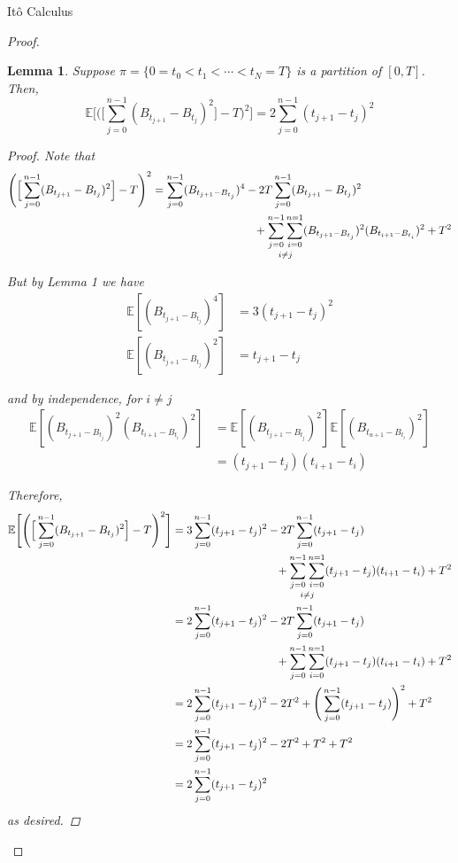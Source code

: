 \documentclass[12pt]{article}
\newtheorem{lemma}{Lemma}
\begin{document}
\begin{section}{It\^{o} Calculus}
\begin{proof}
\begin{lemma} Suppose $\pi = \{0 = t_0 < t_1 < \cdots < t_N =T\}$ is a partition of $[0,T]$. Then,
\begin{equation*}
	\mathbb E\Bigg[\Bigg(\Big[\sum^{n-1}_{j=0}(B_{t_{j+1}} - B_{t_j})^2\Big] - T \Bigg)^2\Bigg] = 2 \sum^{n-1}_{j=0}(t_{j+1} - t_j)^2
\end{equation*}
\begin{proof} Note that
\begin{align*}
	\Bigg(\Big[\sum^{n-1}_{j=0}(B_{t_{j+1}} - B_{t_j})^2\Big] - T \Bigg)^2 &= \sum^{n-1}_{j=0}(B_{t_{j+1} - B_{t_j}})^4 - 2T\sum^{n-1}_{j=0}(B_{t_{j+1}} - B_{t_j})^2 \\
	&\hphantom{{}= \sum^{n-1}_{j=0}(B_{t_{j+1} - B_{t_j}})^4 - } +\mathop{\sum_{j=0}^{n-1}\sum_{i=0}^{n=1}}_{i\neq j}(B_{t_{j+1} - B_{t_j}})^2(B_{t_{i+1} - B_{t_i}})^2 + T^2
\end{align*}

But by Lemma 1 we have
\begin{align*}
	\mathbb E[(B_{t_{j+1} - B_{t_j}})^4] &= 3(t_{j+1} - t_j)^2 \\
	\mathbb E[(B_{t_{j+1} - B_{t_j}})^2] &= t_{j+1} - t_j
\end{align*}

and by independence, for $i \neq j$
\begin{align*}
	\mathbb E[(B_{t_{j+1} - B_{t_j}})^2(B_{t_{i+1} - B_{t_i}})^2] &= \mathbb E[(B_{t_{j+1} - B_{t_j}})^2]\mathbb E[(B_{t_{u+1} - B_{t_i}})^2] \\
	&= (t_{j+1} - t_j)(t_{i+1} - t_i)
\end{align*}

Therefore,
\begin{align*}
	\mathbb E\Bigg[\Bigg(\Big[\sum^{n-1}_{j=0}(B_{t_{j+1}} - B_{t_j})^2\Big] - T \Bigg)^2\Bigg] &= 3\sum^{n-1}_{j=0}(t_{j+1} - t_j)^2 - 2T\sum^{n-1}_{j=0}(t_{j+1} - t_j) \\
	&\hphantom{{}=3\sum^{n-1}_{j=0}(t_{j+1} - t_j)^2 -}+\mathop{\sum_{j=0}^{n-1}\sum_{i=0}^{n=1}}_{i\neq j}(t_{j+1} - t_j)(t_{i+1} - t_i) + T^2 \\
	&= 2\sum^{n-1}_{j=0}(t_{j+1} - t_j)^2 - 2T\sum^{n-1}_{j=0}(t_{j+1} - t_j) \\
	&\hphantom{{}=2\sum^{n-1}_{j=0}(t_{j+1} - t_j)^2 -}+\sum_{j=0}^{n-1}\sum_{i=0}^{n=1}(t_{j+1} - t_j)(t_{i+1} - t_i) + T^2 \\
	&=  2\sum^{n-1}_{j=0}(t_{j+1} - t_j)^2 - 2T^2 + \Bigg(\sum^{n-1}_{j=0}(t_{j+1} - t_j)\Bigg)^2 + T^2 \\
	&= 2\sum^{n-1}_{j=0}(t_{j+1} - t_j)^2 - 2T^2 + T^2 + T^2 \\
	&= 2\sum^{n-1}_{j=0}(t_{j+1} - t_j)^2
\end{align*}
as desired.
\end{proof}
\end{lemma}


\end{proof}
\end{section}
\end{document}
